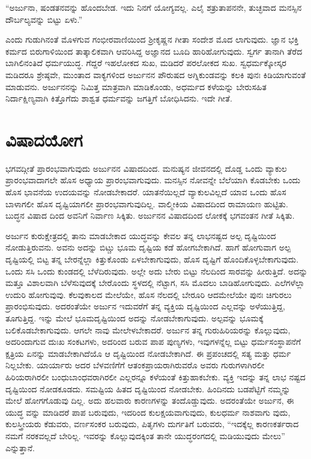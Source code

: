 “ಅರ್ಜುನಾ, ಷಂಡತನವನ್ನು ಹೊಂದಬೇಡ. ಇದು ನಿನಗೆ ಯೋಗ್ಯವಲ್ಲ. ಎಲೈ ಶತ್ರುತಾಪನನೇ, ತುಚ್ಛವಾದ ಮನಸ್ಸಿನ ದೌರ್ಬಲ್ಯವನ್ನು ಬಿಟ್ಟು ಏಳು.”

ಎಂದು ಗುಡುಗಿನಂತೆ ಮೊಳಗುವ ಗಂಭೀರವಾಣಿಯಿಂದ ಶ್ರೀಕೃಷ್ಣನ ಗೀತಾ ಸಂದೇಶ ಮೊದ ಲಾಗುವುದು. ಜ್ಞಾನ ಭಕ್ತಿ ಕರ್ಮದ ಬಿರುಗಾಳಿಯಿಂದ ತಾತ್ಕಾಲಿಕವಾಗಿ ಆವರಿಸಿದ್ದ ಅಜ್ಞಾನದ ಬೂದಿ ಹಾರಿಹೋಗುವುದು. ಸ್ವರ್ಗ ತಾನಾಗಿ ತೆರೆದ ಬಾಗಿಲಿನಂತಿದೆ ಧರ್ಮಯುದ್ಧ. ಗೆದ್ದರೆ ಇಹಲೋಕದ ಸುಖ, ಮಡಿದರೆ ಪರಲೋಕದ ಸುಖ. ಸ್ವಧರ್ಮಕ್ಕೋಸ್ಕರ ಮಡಿದರೂ ಶ್ರೇಷ್ಠವೇ, ಮುಂತಾದ ವಾಕ್ಯಗಳಿಂದ ಅರ್ಜುನನ ಪೌರುಷದ ಅಗ್ನಿಕುಂಡವನ್ನು ಕಲಕಿ ಪುನಃ ಕಿಡಿಯಾಗುವಂತೆ ಮಾಡುವನು. ಅರ್ಜುನನನ್ನು ನಿಮಿತ್ತ ಮಾತ್ರವಾಗಿ ಮಾಡಿಕೊಂಡು, ಅಧರ್ಮದ ಕಳೆಯನ್ನು ಬೇರುಸಹಿತ ನಿರ್ದಾಕ್ಷಿಣ್ಯವಾಗಿ ಕಿತ್ತೊಗೆದು ಶಾಶ್ವತ ಧರ್ಮವನ್ನು ಜಗತ್ತಿಗೆ ಬೋಧಿಸಿದನು. ಇದೇ ಗೀತೆ.


\section*{ವಿಷಾದಯೋಗ}

ಭಗವದ್ಗೀತೆ ಪ್ರಾರಂಭವಾಗುವುದು ಅರ್ಜುನನ ವಿಷಾದದಿಂದ. ಮನುಷ್ಯನ ಜೀವನದಲ್ಲಿ ದೊಡ್ಡ ಒಂದು ವ್ಯಾಕುಲ ಪ್ರಾರಂಭವಾದಾಗಲೇ ಹೊಸ ಅಧ್ಯಾಯ ಪ್ರಾರಂಭವಾಗುವುದು. ಮನಸ್ಸಿನ ನೋವನ್ನೇ ಬೆಲೆಯಾಗಿ ಕೊಡಬೇಕು ಒಂದು ಹೊಸ ಭಾವನೆಯ ಉದಯವನ್ನು ನೋಡಬೇಕಾದರೆ. ಯಾತನೆಯಿಲ್ಲದೆ ವ್ಯಾಕುಲವಿಲ್ಲದೆ ಯಾವ ಒಂದು ಹೊಸ ಬಾಳಾಗಲೀ ಹೊಸ ದೃಷ್ಟಿಯಾಗಲೀ ಪ್ರಾರಂಭವಾಗುವುದಿಲ್ಲ. ವಾಲ್ಮೀಕಿಯ ವಿಷಾದದಿಂದ ರಾಮಾಯಣ ಹುಟ್ಟಿತು. ಬುದ್ಧನ ವಿಷಾದ ದಿಂದ ಅವನಿಗೆ ನಿರ್ವಾಣ ಸಿಕ್ಕಿತು. ಅರ್ಜುನನ ವಿಷಾದದಿಂದ ಲೋಕಕ್ಕೆ ಭಗವಂತನ ಗೀತೆ ಸಿಕ್ಕಿತು.

ಅರ್ಜುನ ಕುರುಕ್ಷೇತ್ರದಲ್ಲಿ ತಾನು ಮಾಡಬೇಕಾದ ಯುದ್ಧವನ್ನು ಕೇವಲ ತನ್ನ ಲಾಭನಷ್ಟದ ಅಲ್ಪ ದೃಷ್ಟಿಯಿಂದ ನೋಡುತ್ತಿರುವನು. ಅವನು ಅದನ್ನು ಬಿಟ್ಚು ಭೂಮ ದೃಷ್ಟಿಯ ಕಡೆ ಹೋಗಬೇಕಾಗಿದೆ. ಹಾಗೆ ಹೋಗುವಾಗ ಅಲ್ಪ ದೃಷ್ಟಿಯಲ್ಲಿ ಬಿಟ್ಟ ತನ್ನ ಬೇರನ್ನೆಲ್ಲಾ ಕಿತ್ತುಕೊಂಡು ಏಳಬೇಕಾಗುವುದು, ಹೊಸ ದೃಷ್ಟಿಗೆ ಹೊಂದಿಕೊಳ್ಳಬೇಕಾಗುವುದು. ಒಂದು ಸಸಿ ಒಂದು ಕುಂಡದಲ್ಲಿ ಬೆಳೆದಿರುವುದು. ಅಲ್ಲೇ ಅದು ಬೇರು ಬಿಟ್ಟು ನೆಲದಿಂದ ಸಾರವನ್ನು ಹೀರುತ್ತಿದೆ. ಅದನ್ನು ಮತ್ತೂ ವಿಶಾಲವಾಗಿ ಬೆಳೆಸುವುದಕ್ಕೆ ಬೇರೊಂದು ಸ್ಥಳದಲ್ಲಿ ನೆಟ್ಟಾಗ, ಸಸಿ ಮೊದಲು ಬಾಡಿಹೋಗುವುದು. ಎಲೆಗಳೆಲ್ಲಾ ಉದುರಿ ಹೋಗುವುವು. ಕೆಲವುಕಾಲದ ಮೇಲೆಯೇ, ಹೊಸ ನೆಲದಲ್ಲಿ ಬೇರೂರಿ ಆದಮೇಲೆಯೇ ಪುನಃ ಚಿಗುರಲು ಪ್ರಾರಂಭಿಸುವುದು. ಅದರಂತೆಯೇ ಅರ್ಜುನ ಇದುವರೆಗೆ ತನ್ನ ವ್ಯಕ್ತಿಯ ದೃಷ್ಟಿಯಿಂದ ಎಲ್ಲವನ್ನು ಅಳೆಯುತ್ತಿದ್ದ, ತೂಗುತ್ತಿದ್ದ. ಇನ್ನು ಮೇಲೆ ಭೂಮದೃಷ್ಟಿಯಿಂದ ಅದನ್ನು ನೋಡಬೇಕಾಗುವುದು. ಅಲ್ಪವನ್ನು ಭೂಮಕ್ಕೆ ಬಲಿಕೊಡಬೇಕಾಗುವುದು. ಆಗಲೇ ನಾವು ಮೇಲೇಳಬೇಕಾದರೆ. ಅರ್ಜುನ ತನ್ನ ಗುರುಹಿರಿಯರನ್ನು ಕೊಲ್ಲುವುದು, ಅದರಿಂದಾಗುವ ದುಃಖ ಸಂಕಟಗಳು, ಅದರಿಂದ ಬರುವ ಪಾಪ ಪುಣ್ಯಗಳು, ಇವುಗಳನ್ನೆಲ್ಲ ಬಿಟ್ಟು ಧರ್ಮಸಂಸ್ಥಾಪನೆಗೆ ಕ್ಷತ್ರಿಯ ಏನನ್ನು ಮಾಡಬೇಕಾಗಿದೆಯೊ ಆ ದೃಷ್ಟಿಯಿಂದ ನೋಡಬೇಕಾಗಿದೆ. ಈ ಪ್ರಪಂಚದಲ್ಲಿ ಸತ್ಯ ಮತ್ತು ಧರ್ಮ ನಿಲ್ಲಬೇಕು. ಯಾರ್ಯಾರು ಅದರ ಬೆಳವಣಿಗೆಗೆ ಆತಂಕಪ್ರಾಯರಾಗಿರುವರೊ ಅವರು ಗುರುಗಳಾಗಿರಲೀ ಹಿರಿಯರಾಗಿರಲೀ ಬಂಧುಬಾಂಧವರಾಗಿರಲೀ ಎಲ್ಲರನ್ನೂ ಕಳೆಯಂತೆ ಕಿತ್ತುಹಾಕಬೇಕು. ವ್ಯಕ್ತಿ ಇದನ್ನು ತನ್ನ ಲಾಭ ನಷ್ಟದ ದೃಷ್ಟಿಯಿಂದ ನೋಡಕೂಡದು. ಸಮಷ್ಟಿಯ ಹಿತದ ದೃಷ್ಟಿಯಿಂದ ನೋಡಬೇಕು. ಹಿಂದಿನದು ಬಡಪೆಟ್ಟಿಗೆ ನಮ್ಮನ್ನು ಮೇಲೆ ಹೋಗಗೊಡುವು ದಿಲ್ಲ. ಅದು ಹಲವಾರು ಕಾರಣಗಳನ್ನು ತಂದೊಡ್ಡುವುದು. ಅದರಂತೆಯೇ ಅರ್ಜುನ, ಈ ಯುದ್ಧ ವನ್ನು ಮಾಡಿದರೆ ಪಾಪ ಬರುವುದು, ಇದರಿಂದ ಕುಲಕ್ಷಯವಾಗುವುದು, ಕುಲಧರ್ಮ ನಾಶವಾಗು ವುದು, ಕುಲಸ್ತ್ರೀಯರು ಕೆಡುವರು, ವರ್ಣಸಂಕರ ಬರುವುದು, ಪಿತೃಗಳು ದುರ್ಗತಿಗೆ ಬರುವರು, “ಇದಕ್ಕೆಲ್ಲ ಕಾರಣಕರ್ತರಾದ ನಮಗೆ ನರಕವಲ್ಲದೆ ಬೇರಿಲ್ಲ. ಇವರನ್ನು ಕೊಲ್ಲುವುದಕ್ಕಿಂತ ತಾನೇ ಯುದ್ಧರಂಗದಲ್ಲಿ ಮಡಿಯುವುದು ಮೇಲು” ಎನ್ನುತ್ತಾನೆ.

